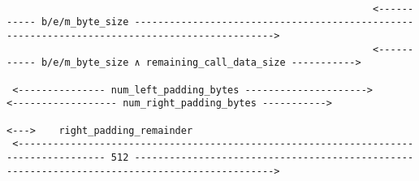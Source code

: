 \documentclass[varwidth=\maxdimen,margin=0.5cm,multi={verbatim}]{standalone}
\begin{document}
\begin{verbatim}
                                                                                                                       
                                                               <----------- b/e/m_byte_size ----------------------------------------------------------------------------------------------> 
                                                               <----------- b/e/m_byte_size ∧ remaining_call_data_size ----------->
                                                                                                                       
 <--------------- num_left_padding_bytes --------------------->                                                                    <------------------ num_right_padding_bytes -----------> 
                                                                                                                                   <--->    right_padding_remainder
 <------------------------------------------------------------------------------------- 512 ----------------------------------------------------------------------------------------------> 




\end{verbatim}
\end{document}

